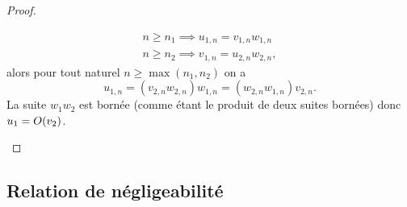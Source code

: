 \begin{proof}
\begin{enumerate}
\begin{align}
                n \geqslant n_1 \implies u_{1,n} = v_{1,n}w_{1,n} \\
            n \geqslant n_2 \implies v_{1,n} = u_{2,n}w_{2,n}, \end{align}
            alors pour tout naturel \(n \geqslant \max(n_1,n_2)\) on a
            \begin{equation}
                u_{1,n} = (v_{2,n} w_{2,n})w_{1,n} = (w_{2,n} w_{1,n}) v_{2,n}.
            \end{equation}
            La suite \(w_1 w_2\) est bornée (comme étant le produit de deux suites 
            bornées) donc \(u_1 = O\mathopen{}\left(v_2\right)\).
    \end{enumerate}
\end{proof}

\subsection{Relation de négligeabilité}

